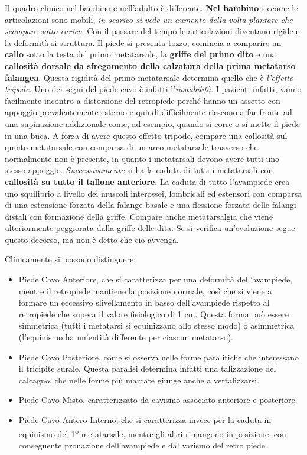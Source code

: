 Il quadro clinico nel bambino e nell'adulto è differente. \textbf{Nel bambino} siccome le articolazioni sono mobili, \emph{in scarico si vede un aumento della volta plantare che scompare sotto carico}. Con il passare del tempo le articolazioni diventano rigide e la deformità si struttura. Il piede si presenta tozzo, comincia a comparire un \textbf{callo} sotto la testa del primo metatarsale, la \textbf{griffe del primo dito} e una \textbf{callosità dorsale da sfregamento della calzatura della prima metatarso falangea}. Questa rigidità del primo
metatarsale determina quello che è \emph{l'effetto tripode}. Uno dei segni del piede cavo è infatti l'\emph{instabilità}. I pazienti infatti, vanno facilmente incontro a distorsione del retropiede perché hanno un
assetto con appoggio prevalentemente esterno e quindi difficilmente riescono a far fronte ad una supinazione addizionale come, ad esempio, quando si corre o si mette il piede in una buca. A forza di avere questo effetto tripode, compare una callosità sul quinto metatarsale con
comparsa di un arco metatarsale trasverso che normalmente non è presente, in quanto i metatarsali devono avere tutti uno stesso appoggio. \emph{Successivamente} si ha la caduta di tutti i metatarsali con \textbf{callosità su tutto il tallone anteriore}. La caduta di tutto
l'avampiede crea uno squilibrio a livello dei muscoli interossei, lombricali ed estensori con comparsa di una estensione forzata della falange basale e una flessione forzata delle falangi distali con formazione della griffe. Compare anche metatarsalgia che viene ulteriormente peggiorata dalla griffe delle dita. Se si verifica
un'evoluzione segue questo decorso, ma non è detto che ciò avvenga.

Clinicamente si possono distinguere:
\begin{itemize}
\item Piede Cavo Anteriore, che si caratterizza per una deformità dell'avampiede, mentre il retropiede mantiene la posizione normale, così che si viene a formare un eccessivo slivellamento in basso dell'avampiede rispetto al retropiede che supera il valore fisiologico di 1 cm. Questa forma può essere simmetrica (tutti i metatarsi si
equinizzano allo stesso modo) o asimmetrica (l'equinismo ha un'entità differente per ciascun metatarso).
\item Piede Cavo Posteriore, come si osserva nelle forme paralitiche che interessano il tricipite surale. Questa paralisi determina infatti una talizzazione del calcagno, che nelle forme più marcate giunge anche a vertalizzarsi.
\item Piede Cavo Misto, caratterizzato da cavismo associato anteriore e posteriore.
\item Piede Cavo Antero-Interno, che si caratterizza invece per la caduta in equinismo del 1\textsuperscript{o} metatarsale, mentre gli altri rimangono in posizione,
con conseguente pronazione dell'avampiede e dal varismo del retro piede.
\end{itemize}

